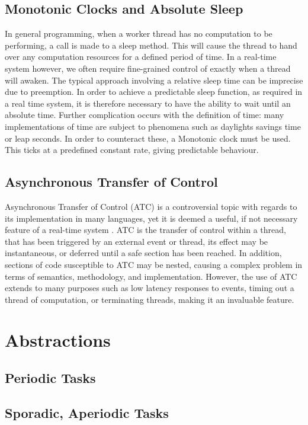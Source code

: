 \subsection{Monotonic Clocks and Absolute Sleep}
In general programming, when a worker thread has no computation to be 
performing, a call is made to a sleep method. This will cause the thread
to hand over any computation resources for a defined period of time. In a 
real-time system however, we often require fine-grained control of exactly
when a thread will awaken. The typical approach involving a relative sleep 
time can be imprecise due to preemption. In order to achieve a predictable 
sleep function, as required in a real time system, it is therefore necessary 
to have the ability to wait until an absolute time. Further complication 
occurs with the definition of time: many implementations of time are subject 
to phenomena such as daylights savings time or leap seconds. 
In order to counteract these, a Monotonic clock must be used. This ticks at a 
predefined constant rate, giving predictable behaviour. 

\subsection{Asynchronous Transfer of Control}
Asynchronous Transfer of Control (ATC) is a controversial topic with regards to its 
implementation in many languages, yet it is deemed a useful, if not necessary 
feature of a real-time system 
\cite{atc-article}. ATC is the transfer 
of control within a thread, that has been triggered by an external event or thread, 
its effect may be instantaneous, or deferred until a safe section has been reached. 
In addition, sections of code susceptible to ATC may be nested, causing a 
complex problem in terms of semantics, methodology, and implementation. 
However, the use of ATC extends to many purposes such as low latency responses to events, timing 
out a thread of computation, or terminating threads, making it an invaluable feature. 

\section{Abstractions}
\subsection{Periodic Tasks}
\subsection{Sporadic, Aperiodic Tasks}
